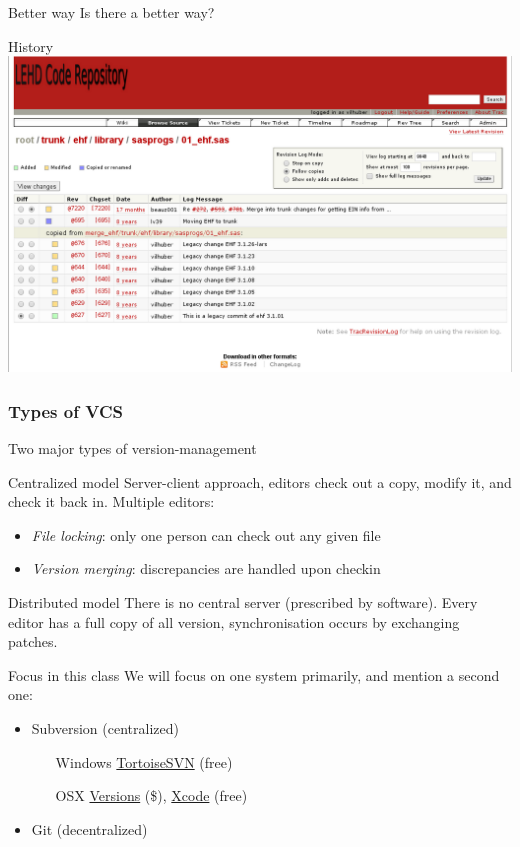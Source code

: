 \documentclass[xcolor=table,compress]{beamer}
\begin{document}
\begin{frame}{Better way}
Is there a better way?
\end{frame}


\begin{frame}{History}
\includegraphics[width=.9\textwidth]{trac-svn-view2.png}
\end{frame}


\subsubsection[Types]{Types of VCS}
\begin{frame}{Two major types of version-management}
\begin{block}{Centralized model}
Server-client approach, editors check out a copy, modify it, and check it back in. Multiple editors:
\begin{itemize}
\item \textit{File locking}: only one person can check out any given file
\item \textit{Version merging}: discrepancies are handled upon checkin
\end{itemize}
\end{block}
\pause
\begin{block}{Distributed model}
There is no central server (prescribed by software). Every editor has a full copy of all version, synchronisation occurs by exchanging patches.
\end{block}
\end{frame}


\begin{frame}{Focus in this class}
We will focus on one system primarily, and mention a second one:
\begin{itemize}
\item Subversion (centralized)
\begin{itemize}
\item[Windows] \href{http://tortoisesvn.tigris.org/}{TortoiseSVN} (free)
\item[OSX] \href{http://versionsapp.com/}{Versions} (\$), \href{http://developer.apple.com/xcode/}{Xcode} (free)
\end{itemize}
\item Git (decentralized)
\end{itemize}
\end{frame}
\end{document}

